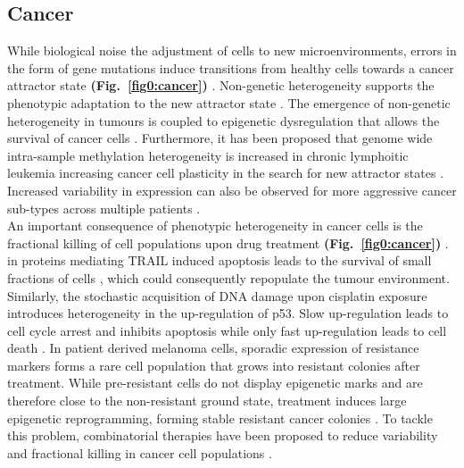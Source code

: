 
\subsection{Cancer}

While biological noise  the adjustment of cells to new microenvironments, errors in the form of gene mutations induce transitions from healthy cells towards a cancer attractor state \textbf{(Fig.~\ref{fig0:cancer})} \citep{Marusyk2012}. 
Non-genetic heterogeneity supports the phenotypic adaptation to the new attractor state \citep{Jia2017}. 
The emergence of non-genetic heterogeneity in tumours is coupled to epigenetic dysregulation that allows the survival of cancer cells \citep{Timp2013}. 
Furthermore, it has been proposed that genome wide intra-sample methylation heterogeneity is increased in chronic lymphoitic leukemia increasing cancer cell plasticity in the search for new attractor states \citep{Landau2014}. 
Increased variability in expression can also be observed for more aggressive cancer sub-types across multiple patients \citep{Ecker2015}. \\

An important consequence of  phenotypic heterogeneity in cancer cells is the fractional killing of cell populations upon drug treatment \textbf{(Fig.~\ref{fig0:cancer})} \citep{Flusberg2015}. 
 in proteins mediating \Gls{TRAIL} induced apoptosis leads to the survival of small fractions of cells \citep{Spencer2009}, which could consequently repopulate the tumour environment. 
Similarly, the stochastic acquisition of DNA damage upon cisplatin exposure introduces heterogeneity in the up-regulation of p53. 
Slow up-regulation leads to cell cycle arrest and inhibits apoptosis while only fast up-regulation leads to cell death \citep{Paek2016}. 
In patient derived melanoma cells, sporadic expression of resistance markers forms a rare cell population that grows into resistant colonies after treatment. 
While pre-resistant cells do not display epigenetic marks and are therefore close to the non-resistant ground state, treatment induces large epigenetic reprogramming, forming stable resistant cancer colonies \citep{Shaffer2017}. 
To tackle this problem, combinatorial therapies have been proposed to reduce variability and fractional killing in cancer cell populations \cite{Paek2016, Roux2015}.\\

